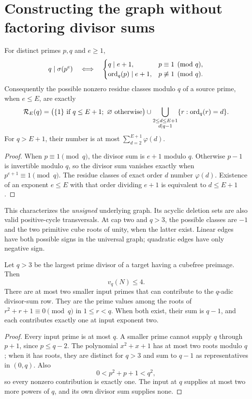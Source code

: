 \section{Constructing the graph without factoring divisor sums}
\begin{lemma}\label{universal:lem:orders}
For distinct primes $p,q$ and $e\ge1$,
\[
 q\mid\sigma(p^e)
 \quad\Longleftrightarrow\quad
 \begin{cases}
 q\mid e+1,&p\equiv1\pmod q,\\
 \operatorname{ord}_q(p)\mid e+1,&p\not\equiv1\pmod q.
 \end{cases}
\]
Consequently the possible nonzero residue classes modulo $q$ of a source prime, when $e\le E$, are exactly
\[
 \mathcal R_E(q)=
 \bigl(\{1\}\text{ if }q\le E+1;\ \varnothing\text{ otherwise}\bigr)
 \cup\bigcup_{\substack{2\le d\le E+1\\d\mid q-1}}
 \{r:\operatorname{ord}_q(r)=d\}.
\]
For $q>E+1$, their number is at most $\sum_{d=2}^{E+1}\varphi(d)$.
\end{lemma}
\begin{proof}
When $p\equiv1\pmod q$, the divisor sum is $e+1$ modulo $q$. Otherwise $p-1$ is invertible modulo $q$, so the divisor sum vanishes exactly when $p^{e+1}\equiv1\pmod q$. The residue classes of exact order $d$ number $\varphi(d)$. Existence of an exponent $e\le E$ with that order dividing $e+1$ is equivalent to $d\le E+1$.
\end{proof}

This characterizes the \emph{unsigned} underlying graph. Its acyclic deletion sets are also valid positive-cycle transversals. At cap two and $q>3$, the possible classes are $-1$ and the two primitive cube roots of unity, when the latter exist. Linear edges have both possible signs in the universal graph; quadratic edges have only negative sign.

\begin{proposition}\label{universal:prop:largest}
Let $q>3$ be the largest prime divisor of a target having a cubefree preimage. Then
\[
 \boxed{v_q(N)\le4.}
\]
There are at most two smaller input primes that can contribute to the $q$-adic divisor-sum row. They are the prime values among the roots of $r^2+r+1\equiv0\pmod q$ in $1\le r<q$. When both exist, their sum is $q-1$, and each contributes exactly one at input exponent two.
\end{proposition}
\begin{proof}
Every input prime is at most $q$. A smaller prime cannot supply $q$ through $p+1$, since $p\le q-2$. The polynomial $x^2+x+1$ has at most two roots modulo $q$; when it has roots, they are distinct for $q>3$ and sum to $q-1$ as representatives in $(0,q)$. Also
\[
 0<p^2+p+1<q^2,
\]
so every nonzero contribution is exactly one. The input at $q$ supplies at most two more powers of $q$, and its own divisor sum supplies none.
\end{proof}


